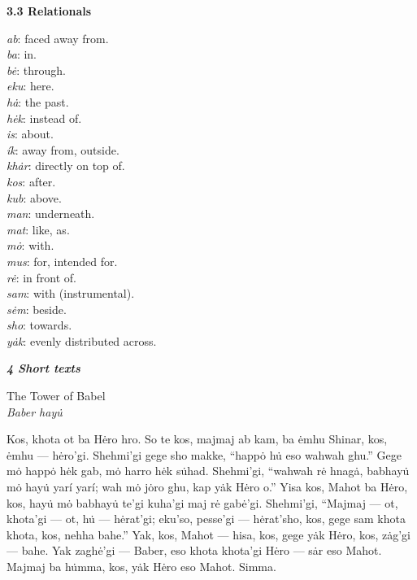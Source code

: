 \documentclass{article}[10pt]
\begin{document}
{\bf 3.3 Relationals}
\begin{multicols}{3}
\noindent
\emph{ab}: faced away from.\\
\emph{ba}: in.\\
\emph{b\.{e}}: through.\\
\emph{eku}: here.\\
\emph{h\.{a}}: the past.\\
\emph{h\.{e}k}: instead of.\\
\emph{is}: about.\\
\emph{\'{i}k}: away from, outside.\\
\emph{kh\.{a}r}: directly on top of.\\
\emph{kos}: after.\\
\emph{kub}: above.\\
\emph{man}: underneath.\\
\emph{mat}: like, as.\\
\emph{m\.{o}}: with.\\
\emph{mus}: for, intended for.\\
\emph{r\.{e}}: in front of.\\
\emph{sam}: with (instrumental).\\
\emph{s\.{e}m}: beside.\\
\emph{sho}: towards.\\
\emph{y\.{a}k}: evenly distributed across.\\
\end{multicols}

\clearpage
{\bf \emph{4 Short texts}}\\
\begin{center}
The Tower of Babel\\
\emph{Baber hay\.{u}}\\
\end{center}

Kos, khota ot ba H\.{e}ro hro. So te kos, majmaj ab kam, ba \.{e}mhu Shinar, kos, \.{e}mhu --- h\.{e}ro'gi. Shehmi'gi gege sho makke, ``happ\.{o} h\.{u} eso wahwah ghu.'' Gege m\.{o} happ\.{o} h\.{e}k gab, m\.{o} harro h\.{e}k s\.{u}had. Shehmi'gi, ``wahwah r\.{e} hnag\.{a}, babhay\.{u} m\.{o} hay\.{u} yar\'{i} yar\'{i}; wah m\.{o} j\.{o}ro ghu, kap y\.{a}k H\.{e}ro o.'' Yisa kos, Mahot ba H\.{e}ro, kos, hay\.{u} m\.{o} babhay\.{u} te'gi kuha'gi maj r\.{e} gab\.{e}'gi. Shehmi'gi, ``Majmaj --- ot, khota'gi --- ot, h\.{u} --- h\.{e}rat'gi; eku'so, pesse'gi --- h\.{e}rat'sho, kos, gege sam khota khota, kos, nehha bahe.'' Yak, kos, Mahot --- hisa, kos, gege y\.{a}k H\.{e}ro, kos, z\.{a}g'gi --- bahe. Yak zagh\.{e}'gi --- Baber, eso khota khota'gi H\.{e}ro --- s\.{a}r eso Mahot. Majmaj ba h\.{u}mma, kos, y\.{a}k H\.{e}ro eso Mahot. Simma.\\
\end{document}
